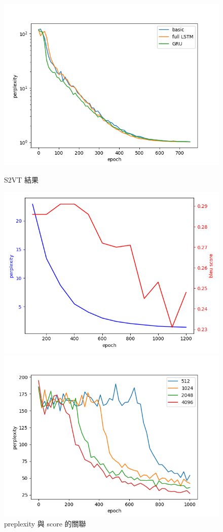 \documentclass[12pt, a4paper]{article}
\theoremstyle{mystyle}	%
\begin{document}
  \begin{figure}[!htb]
    \centering
    \includegraphics[scale=0.35]{jason.png}
    \caption{S2VT 結果}
    \label{fig:jason}
   \endminipage \hfill
    \includegraphics[scale=0.36]{score.png}
    \caption{preplexity 與 score 的關聯}
    \label{fig:score}
   \endminipage \hfill
    \includegraphics[scale=0.35]{esz.png}

\end{figure}
\end{document}

